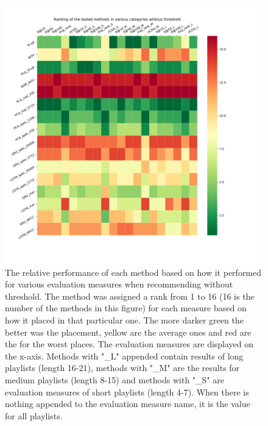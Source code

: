 \begin{figure}[H]
    \centering
	\includegraphics[width=1\linewidth]{./img/no_threshold_method_ranking.png}
	\caption{The relative performance of each method based on how it performed for various evaluation measures when recommending without threshold. The method was assigned a rank from 1 to 16 (16 is the number of the methods in this figure) for each measure based on how it placed in that particular one. The more darker green the better was the placement, yellow are the average ones and red are the for the worst places. The evaluation measures are displayed on the x-axis. Methods with "\_L" appended contain results of long playlists (length 16-21), methods with "\_M" are the results for medium playlists (length 8-15) and methods with "\_S" are evaluation measures of short playlists (length 4-7). When there is nothing appended to the evaluation measure name, it is the value for all playlists.}
	\label{fig:no_threshol_method_comparison}
\end{figure}
